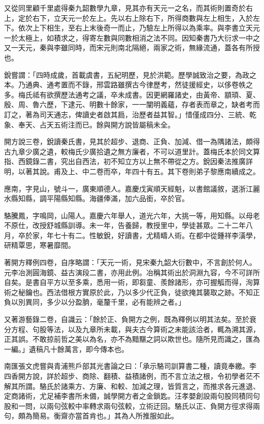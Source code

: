 \begin{pinyinscope}
又從同里顧千里處得秦九韶數學九章，見其亦有天元一之名，而其術則置奇於右上，定於右下，立天元一於左上。先以右上除右下，所得商數與左上相生，入於左下。依次上下相生，至右上末後奇一而止，乃驗左上所得以為乘率。與李書立天元一於太極上，如積求之，得寄左數與同數相消之法不同。因知秦書乃大衍求一中之又一天元，秦與李雖同時，而宋元則南北隔絕，兩家之術，無緣流通，蓋各有所授也。

銳嘗謂：「四時成歲，首載虞書，五紀明歷，見於洪範。歷學誠致治之要，為政之本。乃通典、通考置而不錄，邢雲路雖撰古今律歷考，然徒援經史，以侈卷帙之多。梅氏祗有欲撰歷法通考之議，卒未成書。因更網羅諸史，由黃帝、顓頊、夏、殷、周、魯六歷，下逮元、明數十餘家，一一闡明義蘊，存者表而章之，缺者考而訂之，著為司天通志，俾讀史者啟其扃，治歷者益其智。」惜僅成四分、三統、乾象、奉天、占天五術注而已。餘與開方說皆屬稿未全。

開方說三卷，銳讀秦氏書，見其於超步、退商、正負、加減、借一為隅諸法，頗得古九章少廣之遺，較梅氏少廣拾遺之無方廉者，不可以道里計。蓋梅氏本於同文算指、西鏡錄二書，究出自西法，初不知立方以上無不帶從之方。銳因秦法推廣詳明，以著其說。甫及上、中二卷而卒，年四十有五。其下卷則弟子黎應南續成之。

應南，字見山，號斗一，廣東順德人。嘉慶戊寅順天經魁，以書館議敘，選浙江麗水縣知縣，調平陽縣知縣。海疆俸滿，加六品銜，卒於官。

駱騰鳳，字鳴岡，山陽人。嘉慶六年舉人，道光六年，大挑一等，用知縣。以母老不原仕，改授舒城縣訓導。未一年，告養歸，教授里中，學徒甚眾。二十二年八月，卒於家，年七十有二。性敏銳，好讀書，尤精疇人術。在都中從鍾祥李潢學，研精覃思，寒暑靡間。

著開方釋例四卷，自序略謂：「天元一術，見宋秦九韶大衍數中，不言創於何人。元李冶測圓海鏡、益古演段二書，亦用此例。冶稱其術出於洞淵九容，今不可詳所自矣。是書自平方以至多乘，悉用一術，即芻童、羨餘諸形，亦可握觚而得，洵算術之秘鑰也。西法借根方實原於此，乃以多少代正負，徒欲掩其襲取之跡。不知正負以別異同，多少以分盈朒，毫釐千里，必有能辨之者。」

又著游藝錄二卷，自識云：「餘於正、負開方之例，既為釋例以明其法矣。至於衰分方程、句股等法，以及九章所未載，與夫古今算術之未能該洽者，輒為溯其源，正其誤。不敢掠前哲之美以為名，亦不為黯黮之詞以欺世也。隨所見而識之，匯為一編。」遺稿凡十餘萬言，即今傳本也。

南匯張文虎嘗與青浦熊戶部其光書論之曰：「承示駱司訓算書二種，讀竟奉繳。李四香開方說，詳於超步、商除、翻積、益積諸例，而不言立法之根，令初學者茫不解其所謂。駱氏於諸乘方、方廉、和較、加減之理，皆質言之，而推求各元進退、定商諸術，尤足補李書所未備，誠學開方者之金鎖匙。汪孝嬰創設兩句股同積同句股和一問，以兩句弦較中率轉求兩句弦較，立術迂回。駱氏以正、負開方徑求得兩句，頗為簡易。衡齋亦當首肯也。」其為人所推服如此。


\end{pinyinscope}
